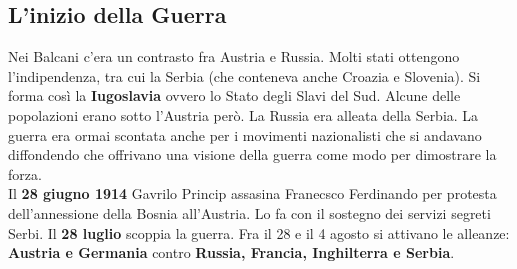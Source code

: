 \subsection{L'inizio della Guerra}
Nei Balcani c'era un contrasto fra Austria e Russia. Molti stati ottengono l'indipendenza, tra cui
la Serbia (che conteneva anche Croazia e Slovenia). Si forma così la \textbf{Iugoslavia} ovvero lo
Stato degli Slavi del Sud. Alcune delle popolazioni erano sotto l'Austria però. La Russia era alleata
della Serbia. La guerra era ormai scontata anche per i movimenti nazionalisti che si andavano
diffondendo che offrivano una visione della guerra come modo per dimostrare la forza.\\ 
[\baselineskip]
Il \textbf{28 giugno 1914} Gavrilo Princip assasina Franecsco Ferdinando per protesta dell'annessione
della Bosnia all'Austria. Lo fa con il sostegno dei servizi segreti Serbi. Il \textbf{28 luglio}
scoppia la guerra. Fra il 28 e il 4 agosto si attivano le alleanze: \textbf{Austria e Germania} 
contro \textbf{Russia, Francia, Inghilterra e Serbia}.


